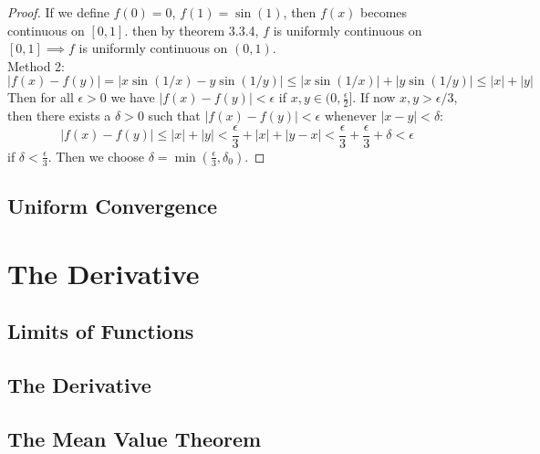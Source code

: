 \documentclass[12pt]{book}
\newenvironment{exercise}[2][Exercise]{\begin{trivlist}
\item[\hskip \labelsep {\bfseries #1}\hskip \labelsep {\bfseries #2.}]}{\end{trivlist}}
\begin{document}
\begin{exercise}{1.4.6}
\begin{exercise}{3.3.10}
\begin{proof}
    If we define $f(0)=0$, $f(1)=\sin(1)$, then $f(x)$ becomes continuous on $[0,1]$. then by theorem 3.3.4, $f$ is uniformly continuous on $[0,1] \implies f$ is uniformly continuous on $(0,1)$.\\
    Method 2: 
        \[ |f(x)-f(y)| = |x \sin(1/x) - y \sin(1/y)| \leq |x \sin(1/x)| + |y \sin(1/y)| \leq |x|+|y| \]
    Then for all $\epsilon>0$ we have $|f(x)-f(y)|<\epsilon$ if $x,y \in (0,\frac{\epsilon}{2}]$. If now $x,y > \epsilon/3$, then there exists a $\delta>0$ such that $|f(x)-f(y)| <\epsilon$ whenever $|x-y| < \delta$: 
        \[ |f(x)-f(y)| \leq |x|+|y| < \frac{\epsilon}{3} + |x| + |y-x| < \frac{\epsilon}{3} + \frac{\epsilon}{3}+ \delta < \epsilon \]
    if $\delta< \frac{\epsilon}{3}$. Then we choose $\delta= \min(\frac{\epsilon}{3}, \delta_0)$.
    \end{proof}
\end{exercise}


\section{Uniform Convergence}



\chapter{The Derivative}
\section{Limits of Functions}



\section{The Derivative}



\section{The Mean Value Theorem}

\begin{exercise}{4.3.1}
\end{exercise}


\end{exercise}
\end{document}
